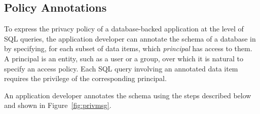 

\subsection{Policy Annotations}
\label{ss:policy}

To express the privacy policy of a database-backed application at the
level of SQL queries, the application developer can annotate the
schema of a database in \name{} by specifying, for each subset of data
items, which {\em principal} has access to them.  A principal is an
entity, such as a user or a group, over which it is natural to specify
an access policy.  Each SQL query involving an annotated data item
requires the privilege of the corresponding principal. 


An application developer annotates the schema using the steps
described below and shown in Figure~\ref{fig:privmsg}.

